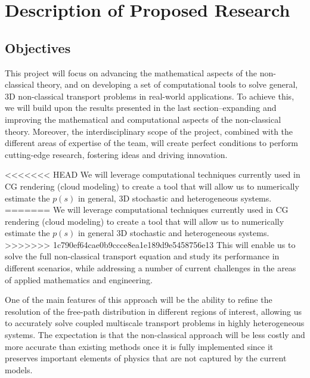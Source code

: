 \documentclass[12pt]{article}
\begin{document}
\section{Description of Proposed Research}

\subsection{Objectives}

This project will focus on advancing the mathematical aspects of the non-classical theory, and on developing a set of computational tools to solve general, 3D non-classical transport problems in real-world applications.
To achieve this, we will build upon the results presented in the last section--expanding and improving the mathematical and computational aspects of the non-classical theory.
Moreover, the interdisciplinary scope of the project, combined with the different areas of expertise of the team, will create perfect conditions to perform cutting-edge research, fostering ideas and driving innovation.

<<<<<<< HEAD
We will leverage computational techniques currently used in CG rendering (cloud modeling) to create a tool that will allow us to numerically estimate the $p(s)$ in general, 3D stochastic and heterogeneous systems.
=======
We will leverage computational techniques currently used in CG rendering (cloud modeling) to create a tool that will allow us to numerically estimate the $p(s)$ in general 3D stochastic and heterogeneous systems.
>>>>>>> 1c790ef64cae0b9ccce8ea1e189d9e5458756e13
This will enable us to solve the full non-classical transport equation and study its performance in different scenarios, while addressing a number of current challenges in the areas of applied mathematics and engineering.

One of the main features of this approach will be the ability to refine the resolution of the free-path distribution in different regions of interest, allowing us to accurately solve coupled multiscale transport problems in highly heterogeneous systems.
The expectation is that the non-classical approach will be less costly and more accurate than existing methods once it is fully implemented since it preserves important elements of physics that are not captured by the current models.
\end{document}
